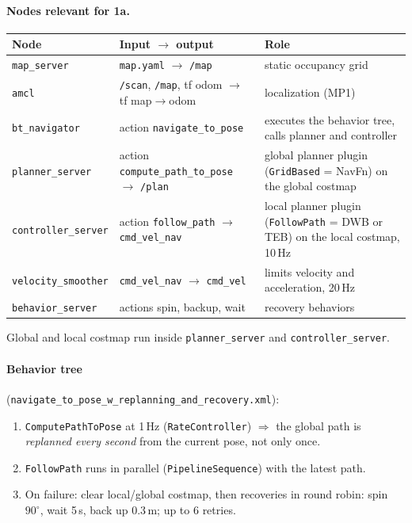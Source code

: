 \documentclass[10pt]{article}
\newcommand{\pkg}[1]{\texttt{#1}}
\begin{document}
\paragraph{Nodes relevant for 1a.}
\begin{tabular}{p{3.2cm}p{5.2cm}p{7.2cm}}
\toprule
Node & Input $\rightarrow$ output & Role \\
\midrule
\pkg{map\_server} & \pkg{map.yaml} $\rightarrow$ \pkg{/map} & static occupancy grid \\
\pkg{amcl} & \pkg{/scan}, \pkg{/map}, tf odom $\rightarrow$ tf map$\rightarrow$odom & localization (MP1) \\
\pkg{bt\_navigator} & action \pkg{navigate\_to\_pose} & executes the behavior tree, calls planner and controller \\
\pkg{planner\_server} & action \pkg{compute\_path\_to\_pose} $\rightarrow$ \pkg{/plan} & global planner plugin (\pkg{GridBased} = NavFn) on the global costmap \\
\pkg{controller\_server} & action \pkg{follow\_path} $\rightarrow$ \pkg{cmd\_vel\_nav} & local planner plugin (\pkg{FollowPath} = DWB or TEB) on the local costmap, 10\,Hz \\
\pkg{velocity\_smoother} & \pkg{cmd\_vel\_nav} $\rightarrow$ \pkg{cmd\_vel} & limits velocity and acceleration, 20\,Hz \\
\pkg{behavior\_server} & actions spin, backup, wait & recovery behaviors \\
\bottomrule
\end{tabular}
Global and local costmap run inside \pkg{planner\_server} and \pkg{controller\_server}.

\paragraph{Behavior tree} (\pkg{navigate\_to\_pose\_w\_replanning\_and\_recovery.xml}):
\begin{enumerate}
  \item \pkg{ComputePathToPose} at 1\,Hz (\pkg{RateController}) $\Rightarrow$ the global path is
        \emph{replanned every second} from the current pose, not only once.
  \item \pkg{FollowPath} runs in parallel (\pkg{PipelineSequence}) with the latest path.
  \item On failure: clear local/global costmap, then recoveries in round robin:
        spin $90^\circ$, wait 5\,s, back up 0.3\,m; up to 6 retries.
\end{enumerate}
\end{document}
